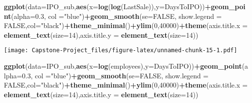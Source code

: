 \documentclass[]{article}
\newenvironment{Shaded}{\begin{snugshade}}{\end{snugshade}}
\newcommand{\DataTypeTok}[1]{\textcolor[rgb]{0.13,0.29,0.53}{#1}}
\newcommand{\DecValTok}[1]{\textcolor[rgb]{0.00,0.00,0.81}{#1}}
\newcommand{\FloatTok}[1]{\textcolor[rgb]{0.00,0.00,0.81}{#1}}
\newcommand{\KeywordTok}[1]{\textcolor[rgb]{0.13,0.29,0.53}{\textbf{#1}}}
\newcommand{\NormalTok}[1]{#1}
\newcommand{\OperatorTok}[1]{\textcolor[rgb]{0.81,0.36,0.00}{\textbf{#1}}}
\newcommand{\OtherTok}[1]{\textcolor[rgb]{0.56,0.35,0.01}{#1}}
\newcommand{\StringTok}[1]{\textcolor[rgb]{0.31,0.60,0.02}{#1}}
\begin{document}
\begin{Shaded}
\begin{Highlighting}[]
\KeywordTok{ggplot}\NormalTok{(}\DataTypeTok{data=}\NormalTok{IPO_sub,}\KeywordTok{aes}\NormalTok{(}\DataTypeTok{x=}\KeywordTok{log}\NormalTok{(}\KeywordTok{log}\NormalTok{(LastSale)),}\DataTypeTok{y=}\NormalTok{DaysToIPO))}\OperatorTok{+}\KeywordTok{geom_point}\NormalTok{(}\DataTypeTok{alpha=}\FloatTok{0.3}\NormalTok{, }\DataTypeTok{col =}\StringTok{"blue"}\NormalTok{)}\OperatorTok{+}\KeywordTok{geom_smooth}\NormalTok{(}\DataTypeTok{se=}\OtherTok{FALSE}\NormalTok{, }\DataTypeTok{show.legend =} \OtherTok{FALSE}\NormalTok{,}\DataTypeTok{col=}\StringTok{"black"}\NormalTok{)}\OperatorTok{+}\KeywordTok{theme_minimal}\NormalTok{()}\OperatorTok{+}\KeywordTok{ylim}\NormalTok{(}\DecValTok{0}\NormalTok{,}\DecValTok{40000}\NormalTok{)}\OperatorTok{+}\KeywordTok{theme}\NormalTok{(}\DataTypeTok{axis.title.x =} \KeywordTok{element_text}\NormalTok{(}\DataTypeTok{size=}\DecValTok{14}\NormalTok{),}\DataTypeTok{axis.title.y =} \KeywordTok{element_text}\NormalTok{(}\DataTypeTok{size=}\DecValTok{14}\NormalTok{))}
\end{Highlighting}
\end{Shaded}

\texttt{[image: Capstone-Project\_files/figure-latex/unnamed-chunk-15-1.pdf]}

\begin{Shaded}
\begin{Highlighting}[]
\KeywordTok{ggplot}\NormalTok{(}\DataTypeTok{data=}\NormalTok{IPO_sub,}\KeywordTok{aes}\NormalTok{(}\DataTypeTok{x=}\KeywordTok{log}\NormalTok{(employees),}\DataTypeTok{y=}\NormalTok{DaysToIPO))}\OperatorTok{+}\KeywordTok{geom_point}\NormalTok{(}\DataTypeTok{alpha=}\FloatTok{0.3}\NormalTok{, }\DataTypeTok{col =}\StringTok{"blue"}\NormalTok{)}\OperatorTok{+}\KeywordTok{geom_smooth}\NormalTok{(}\DataTypeTok{se=}\OtherTok{FALSE}\NormalTok{, }\DataTypeTok{show.legend =} \OtherTok{FALSE}\NormalTok{,}\DataTypeTok{col=}\StringTok{"black"}\NormalTok{)}\OperatorTok{+}\KeywordTok{theme_minimal}\NormalTok{()}\OperatorTok{+}\KeywordTok{ylim}\NormalTok{(}\DecValTok{0}\NormalTok{,}\DecValTok{40000}\NormalTok{)}\OperatorTok{+}\KeywordTok{theme}\NormalTok{(}\DataTypeTok{axis.title.x =} \KeywordTok{element_text}\NormalTok{(}\DataTypeTok{size=}\DecValTok{14}\NormalTok{),}\DataTypeTok{axis.title.y =} \KeywordTok{element_text}\NormalTok{(}\DataTypeTok{size=}\DecValTok{14}\NormalTok{))}
\end{Highlighting}
\end{Shaded}
\end{document}
